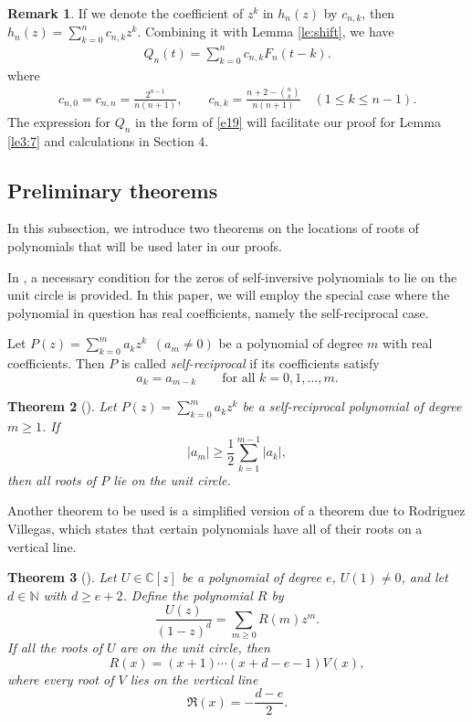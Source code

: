 \documentclass[12pt]{article}
\newtheorem{theorem}{Theorem}[section]
\theoremstyle{definition}
\newtheorem{remark}[theorem]{Remark}
\begin{document}
\begin{remark} If we denote the coefficient of $z^k$ in $h_n(z)$ by $c_{n,k}$, then
\(h_n(z)=\sum_{k=0}^{n} c_{n,k}z^k.\) Combining it with Lemma \ref{le:shift}, we have
\begin{eqnarray}\label{e19}
Q_n(t)=\sum_{k=0}^{n}c_{n,k}F_n(t-k).
\end{eqnarray}
where
\begin{eqnarray}\label{e20}
c_{n,0}=c_{n,n}=\frac{2^{n-1}}{n(n+1)},\qquad
c_{n,k}=\frac{n+2-\binom{n}{k}}{n(n+1)}\quad (1\le k\le n-1).
\end{eqnarray}
The expression for $Q_n$ in the form of \eqref{e19} will facilitate our proof for Lemma \ref{le3:7} and calculations in Section 4.
\end{remark}




\subsection{Preliminary theorems}
In this subsection, we introduce two theorems on the locations of roots of polynomials that will be used later in our proofs.

In \cite{LakatosLosonczi2004}, a necessary condition for the zeros of self-inversive polynomials to lie on the unit circle is provided. In this paper, we will employ the special case where the polynomial in question has real coefficients, namely the self-reciprocal case.

Let \(P(z)=\sum_{k=0}^{m}a_kz^k\)~$(a_m\neq 0)$ be a polynomial of degree \(m\) with real coefficients. Then \(P\) is called \emph{self-reciprocal} if its coefficients satisfy
\[
a_k=a_{m-k}\qquad\mbox{for all }k=0,1,\dots,m.
\]

\begin{theorem}[\cite{LakatosLosonczi2004}]
\label{thm:LL}
Let \(P(z)=\sum_{k=0}^{m}a_kz^k\) be a self-reciprocal polynomial of degree $m\geq 1$. If
\[
|a_m|\ge \frac12\sum_{k=1}^{m-1}|a_k|,
\]
then all roots of \(P\) lie on the unit circle.
\end{theorem}


Another theorem to be used is a simplified version of
a theorem due to Rodriguez Villegas, which states that certain polynomials have all of their roots on a vertical line.

\begin{theorem}[\cite{RodriguezVillegas2002}]
\label{thm:RV}
Let \(U\in\mathbb{C}[z]\) be a  polynomial of degree \(e\), \(U(1)\ne 0\), and let $d\in \mathbb{N}$ with \(d\geq e+2\). Define the polynomial \(R\) by
\[
\frac{U(z)}{(1-z)^d}=\sum_{m\ge 0}R(m)z^m.
\]
If all the roots of \(U\) are on the unit circle,
then $$R(x)=(x+1)\cdots(x+d-e-1)V(x),$$ where every root of \(V\) lies on the vertical line
\[
\Re  (x)=-\frac{d-e}{2}.
\]
\end{theorem}
\end{document}
